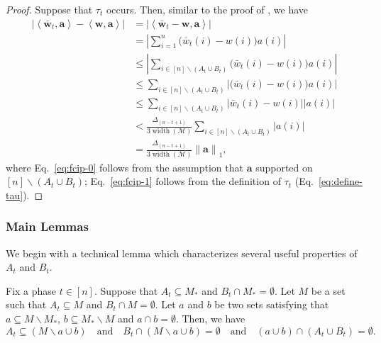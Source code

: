 \documentclass{article}
\newcommand{\M}{\mathcal M}
\newcommand{\del}{\backslash}
\DeclareMathOperator{\rank}{width}
\newcommand{\inn}[1]{\left\langle #1 \right\rangle}
\newcommand{\nor}[1]{\left\|#1\right\|}
\renewcommand{\vec}[1]{\boldsymbol{#1}}
\begin{document}
\begin{proof}
Suppose that $\tau_t$ occurs. 
Then, similar to the proof of , we have
\begin{align}
\left| \inn{\vec{\bar w}_t, \vec a} - \inn{\vec w, \vec a} \right|
&= \left| \inn{\vec{\bar w}_t-\vec w, \vec a} \right|  \nonumber \\
&= \left|\sum_{i=1}^n \big(\bar w_t(i)-w(i)\big) a(i) \right| \nonumber \\
&\le \left|\sum_{i\in[n]\del (A_t\cup B_t)} \big(\bar w_t(i)-w(i)\big) a(i) \right| \label{eq:fcip-0} \\
&\le \sum_{i\in[n]\del (A_t\cup B_t)} \left| \big(\bar w_t(i)-w(i)\big) a(i)\right| \nonumber\\
&\le \sum_{i\in[n]\del (A_t\cup B_t)} \left|\bar w_t(i)-w(i)\right| |a(i)| \nonumber\\
&< \frac{\Delta_{(n-t+1)}}{3\rank(\M)} \sum_{i\in[n]\del (A_t\cup B_t)} |a(i)| \label{eq:fcip-1}\\
&= \frac{\Delta_{(n-t+1)}}{3\rank(\M)} \nor{\vec a}_1, \nonumber
\end{align}
where Eq.~\eqref{eq:fcip-0} follows from the assumption that $\vec a$ supported on $[n] \del (A_t\cup B_t)$;
Eq.~\eqref{eq:fcip-1} follows from the definition of $\tau_t$ (Eq.~\eqref{eq:define-tau}).
\end{proof}

\subsubsection{Main Lemmas}

We begin with a technical lemma which characterizes several useful properties of $A_t$ and $B_t$.

\begin{lemma}
Fix a phase $t\in[n]$. Suppose that $A_t\subseteq M_*$ and $B_t \cap M_* = \emptyset$.
Let $M$ be a set such that $A_t \subseteq M$ and $B_t \cap M = \emptyset$.
Let $a$ and $b$ be two sets satisfying that $a \subseteq M\del M_*$, $b \subseteq M_* \del M$ and $a\cap b = \emptyset$.
Then, we have
$$
A_t \subseteq (M \del a \cup b) \quad\text{and}\quad B_t \cap (M \del a \cup b) = \emptyset
\quad\text{and}\quad (a\cup b)\cap (A_t\cup B_t) = \emptyset.
$$
\label{lemma:set-tech}
\end{lemma}
\end{document}

